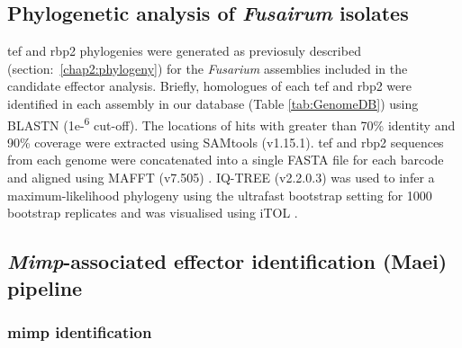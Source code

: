 

\subsection{Phylogenetic analysis of \textit{Fusairum} isolates}

\Ac{tef} and \ac{rbp2} phylogenies were generated as previosuly described (section:~\ref{chap2:phylogeny}) for the \textit{Fusarium} assemblies included in the candidate effector analysis. Briefly, homologues of each \ac{tef} and \ac{rbp2} were identified in each assembly in our database  (Table \ref{tab:GenomeDB}) using BLASTN (1e-\textsuperscript{6} cut-off). The locations of hits with greater than 70\% identity and 90\% coverage were extracted using SAMtools (v1.15.1). \Ac{tef} and \ac{rbp2} sequences from each genome were concatenated into a single FASTA file for each barcode and aligned using MAFFT (v7.505) \parencite{Katoh2019}. IQ-TREE (v2.2.0.3) \parencite{Nguyen2015} was used to infer a maximum-likelihood phylogeny using the ultrafast bootstrap setting for 1000 bootstrap replicates and was visualised using iTOL \parencite{Letunic2021}. 





\subsection{\textit{Mimp}-associated effector identification (Maei) pipeline}

\subsubsection{\Ac{mimp} identification}

